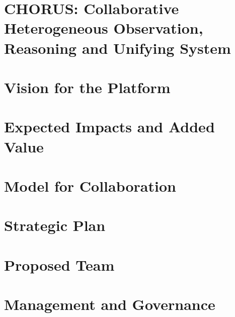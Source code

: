 \documentclass[pdftex,12pt]{article}
\begin{document}
\pagestyle{myheadings}

\section*{CHORUS:  Collaborative Heterogeneous Observation, Reasoning and Unifying System}

\section{Vision for the Platform}



\section{Expected Impacts and Added Value}



\section{Model for Collaboration}



\section{Strategic Plan}



\section{Proposed Team}



\section{ Management and Governance }



\newpage


\end{document}
